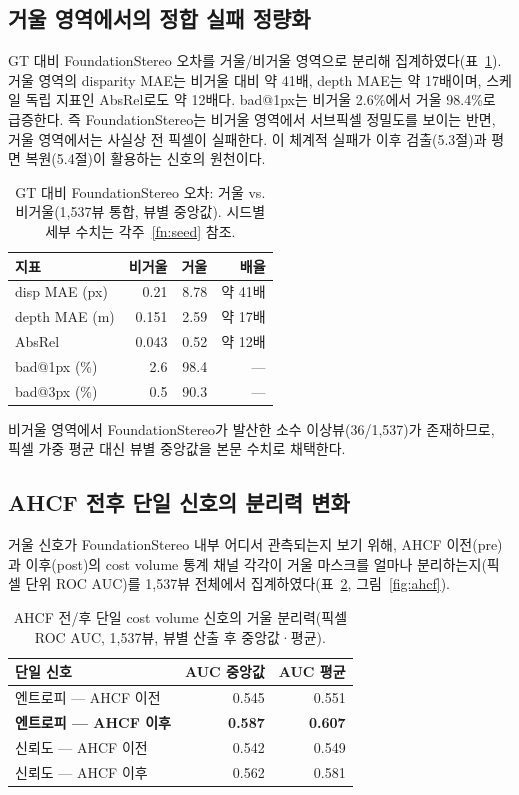 \documentclass[twocolumn,10pt,a4paper]{article}
\begin{document}
\subsection{거울 영역에서의 정합 실패 정량화}

GT 대비 FoundationStereo 오차를 거울/비거울 영역으로 분리해 집계하였다(표~\ref{tab:gt}). 거울 영역의 disparity MAE는 비거울 대비 약 41배, depth MAE는 약 17배이며, 스케일 독립 지표인 AbsRel로도 약 12배다. bad@1px는 비거울 2.6\%에서 거울 98.4\%로 급증한다. 즉 FoundationStereo는 비거울 영역에서 서브픽셀 정밀도를 보이는 반면, 거울 영역에서는 사실상 전 픽셀이 실패한다. 이 체계적 실패가 이후 검출(5.3절)과 평면 복원(5.4절)이 활용하는 신호의 원천이다.

\begin{table}[t]
\centering
\small
\caption{GT 대비 FoundationStereo 오차: 거울 vs. 비거울(1,537뷰 통합, 뷰별 중앙값). 시드별 세부 수치는 각주~\ref{fn:seed} 참조.}
\label{tab:gt}
\begin{tabular}{lrrr}
\toprule
지표 & 비거울 & 거울 & 배율 \\
\midrule
disp MAE (px) & 0.21 & 8.78 & 약 41배 \\
depth MAE (m) & 0.151 & 2.59 & 약 17배 \\
AbsRel & 0.043 & 0.52 & 약 12배 \\
bad@1px (\%) & 2.6 & 98.4 & --- \\
bad@3px (\%) & 0.5 & 90.3 & --- \\
\bottomrule
\end{tabular}
\end{table}

비거울 영역에서 FoundationStereo가 발산한 소수 이상뷰(36/1,537)가 존재하므로, 픽셀 가중 평균 대신 뷰별 중앙값을 본문 수치로 채택한다.

\subsection{AHCF 전후 단일 신호의 분리력 변화}

거울 신호가 FoundationStereo 내부 어디서 관측되는지 보기 위해, AHCF 이전(pre)과 이후(post)의 cost volume 통계 채널 각각이 거울 마스크를 얼마나 분리하는지(픽셀 단위 ROC AUC)를 1,537뷰 전체에서 집계하였다(표~\ref{tab:ahcf}, 그림~\ref{fig:ahcf}).

\begin{table}[t]
\centering
\small
\caption{AHCF 전/후 단일 cost volume 신호의 거울 분리력(픽셀 ROC AUC, 1,537뷰, 뷰별 산출 후 중앙값·평균).}
\label{tab:ahcf}
\begin{tabular}{lrr}
\toprule
단일 신호 & AUC 중앙값 & AUC 평균 \\
\midrule
엔트로피 --- AHCF 이전 & 0.545 & 0.551 \\
\textbf{엔트로피 --- AHCF 이후} & \textbf{0.587} & \textbf{0.607} \\
신뢰도 --- AHCF 이전 & 0.542 & 0.549 \\
신뢰도 --- AHCF 이후 & 0.562 & 0.581 \\
\bottomrule
\end{tabular}
\end{table}
\end{document}
